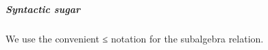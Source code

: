 \begin{code}
\\
%
\>[1]%
\>[19]\AgdaSymbol{((}\AgdaSpace{}%
\AgdaSymbol{)}\AgdaSpace{}%
\AgdaOperator{\AgdaFunction{[}}\AgdaSpace{}%
\AgdaSpace{}%
\AgdaOperator{\AgdaFunction{]/ker}}\AgdaSpace{}%
\AgdaSymbol{)}\AgdaSpace{}%
\AgdaSpace{}%
\<%
\\
%
\\[\AgdaEmptyExtraSkip]%
\>[0]\AgdaSpace{}%
\AgdaSpace{}%
\AgdaSpace{}%
\AgdaSpace{}%
\AgdaSpace{}%
\AgdaSpace{}%
\AgdaSpace{}%
\AgdaSpace{}%
\AgdaSymbol{=}\AgdaSpace{}%
\AgdaSpace{}%
\AgdaSymbol{(}\AgdaSpace{}%
\AgdaSymbol{)}\AgdaSpace{}%
\AgdaSpace{}%
\AgdaSpace{}%
\AgdaSpace{}%
\AgdaSpace{}%
\AgdaSpace{}%
\<%
\end{code}
\ccpad
\subparagraph{Syntactic sugar}\label{syntactic-sugar}

We use the convenient ≤ notation for the subalgebra relation.

\begin{code}%
\>[0]\AgdaSpace{}%
\AgdaSymbol{:}\AgdaSpace{}%
\AgdaSymbol{\{}\AgdaSpace{}%
\AgdaSpace{}%
\AgdaSymbol{:}\AgdaSpace{}%
\AgdaSymbol{\}(}\AgdaSpace{}%
\AgdaSymbol{:}\AgdaSpace{}%
\AgdaSpace{}%
\AgdaSpace{}%
\AgdaSymbol{)(}\AgdaSpace{}%
\AgdaSymbol{:}\AgdaSpace{}%
\AgdaSpace{}%
\AgdaSpace{}%
\AgdaSymbol{)}\AgdaSpace{}%
\AgdaSpace{}%
\AgdaSpace{}%
\AgdaSpace{}%
\AgdaSpace{}%
\AgdaSpace{}%
\AgdaSpace{}%
\AgdaSpace{}%
\AgdaSpace{}%
\<%
\\
\>[0]\AgdaSpace{}%
\AgdaSpace{}%
\AgdaSpace{}%
\AgdaSymbol{=}\AgdaSpace{}%
\AgdaSpace{}%
\AgdaSpace{}%
\<%
\end{code}

